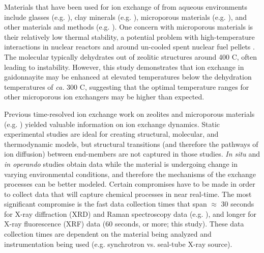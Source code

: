 \documentclass[journal=acsodf,manuscript=article]{achemso}
\begin{document}
Materials that have been used for ion exchange of  from aqueous environments include glasses (e.g. \cite{Mastelaro2018,Peterson2018,Tollefson2017,Yang2017}), clay minerals (e.g. \cite{Dobre2018,Fernandes2016,Jolin2016,Pusch_1992,Y_ld_z_2011,Zhang_2017}), microporous materials (e.g.  \cite{Celestian_2013,Celestian_2005,Fewox2011,Borai_2009,WoldeGabriel_1993,Marinin_2000,Dyer_1984}), and other materials and methods (e.g. \cite{van_Deventer_2007,Romanchuk_2013,Misaelides_2011,Manos_2008,Entry_1999,Mertz_2013,Riley_2013}). One concern with microporous materials is their relatively low thermal stability, a potential problem with high-temperature interactions in nuclear reactors and around un-cooled spent nuclear fuel pellets \cite{Ewing_2015,Weber_1997}. The molecular  typically dehydrates out of zeolitic structures around 400 \degree C, often leading to instability. However, this study demonstrates that ion exchange in gaidonnayite may be enhanced at elevated temperatures below the dehydration temperatures of \textit{ca.} 300 \degree C, suggesting that the optimal temperature ranges for other microporous ion exchangers may be higher than expected.

Previous time-resolved ion exchange work on zeolites and microporous materials  (e.g. \cite{Norby_1996,Norby_1998,Dalconi_2003,Celestian_2010}) yielded valuable information on ion exchange dynamics. Static experimental studies are ideal for creating structural, molecular, and thermodynamic models, but structural transitions (and therefore the pathways of ion diffusion) between end-members are not captured in those studies. \textit{In situ} and \textit{in operando} studies obtain data while the material is undergoing change in varying environmental conditions, and therefore the mechanisms of the exchange processes can be better modeled. Certain compromises have to be made in order to collect data that will capture chemical processes in near real-time. The most significant compromise is the fast data collection times that span $\approx$ 30 seconds for X-ray diffraction (XRD) and Raman spectroscopy data (e.g. \cite{Celestian_2010}), and longer for X-ray fluorescence (XRF) data (60 seconds, or more; this study). These data collection times are dependent on the material being analyzed and instrumentation being used (e.g. synchrotron vs. seal-tube X-ray source).
\end{document}
